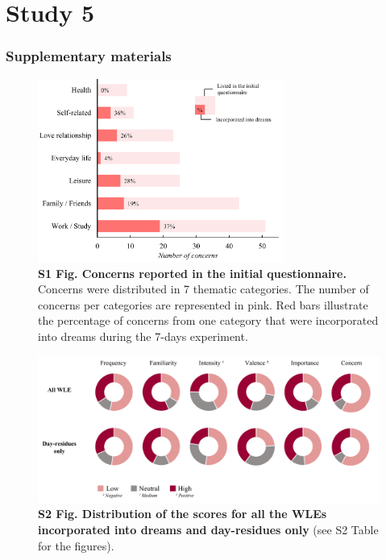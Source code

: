\cleardoublepage

\chapter{Study 5}
\label{res:wle}

\cleardoublepage



\cleardoublepage

\subsection*{Supplementary materials}
\label{res:wle:supp}
\vspace*{1cm}

\begin{figure}[htbp]
	\includegraphics[width=0.72\textwidth]{Fig/Results/WLE/S1_Fig.png}
	\caption*{\textbf{S1 Fig. Concerns reported in the initial questionnaire.} Concerns were distributed in 7 thematic categories. The number of concerns per categories are represented in pink. Red bars illustrate the percentage of concerns from one category that were incorporated into dreams during the 7-days experiment.}
\end{figure}

\vspace*{3cm}

\begin{figure}[htbp]
	\includegraphics[width=\textwidth]{Fig/Results/WLE/S2_Fig.png}
	\caption*{\textbf{S2 Fig. Distribution of the scores for all the WLEs incorporated into dreams and day-residues only} (see S2 Table for the figures).}
\end{figure}

